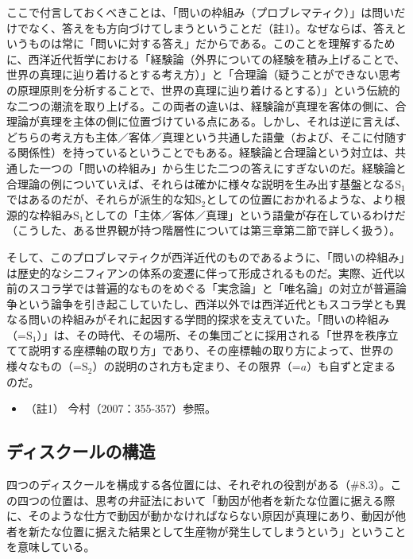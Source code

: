 ここで付言しておくべきことは、「問いの枠組み（プロブレマティク）」は問いだけでなく、答えをも方向づけてしまうということだ（註1）。なぜならば、答えというものは常に「問いに対する答え」だからである。このことを理解するために、西洋近代哲学における「経験論（外界についての経験を積み上げることで、世界の真理に辿り着けるとする考え方）」と「合理論（疑うことができない思考の原理原則を分析することで、世界の真理に辿り着けるとする）」という伝統的な二つの潮流を取り上げる。この両者の違いは、経験論が真理を客体の側に、合理論が真理を主体の側に位置づけている点にある。しかし、それは逆に言えば、どちらの考え方も主体／客体／真理という共通した語彙（および、そこに付随する関係性）を持っているということでもある。経験論と合理論という対立は、共通した一つの「問いの枠組み」から生じた二つの答えにすぎないのだ。経験論と合理論の例についていえば、それらは確かに様々な説明を生み出す基盤となる\(\textrm{S}_1\)ではあるのだが、それらが派生的な知\(\textrm{S}_2\)としての位置におかれるような、より根源的な枠組み\(\textrm{S}_1\)としての「主体／客体／真理」という語彙が存在しているわけだ（こうした、ある世界観が持つ階層性については第三章第二節で詳しく扱う）。

そして、このプロブレマティクが西洋近代のものであるように、「問いの枠組み」は歴史的なシニフィアンの体系の変遷に伴って形成されるものだ。実際、近代以前のスコラ学では普遍的なものをめぐる「実念論」と「唯名論」の対立が普遍論争という論争を引き起こしていたし、西洋以外では西洋近代ともスコラ学とも異なる問いの枠組みがそれに起因する学問的探求を支えていた。「問いの枠組み（=\(\textrm{S}_1\)）」は、その時代、その場所、その集団ごとに採用される「世界を秩序立てて説明する座標軸の取り方」であり、その座標軸の取り方によって、世界の様々なもの（=\(\textrm{S}_2\)）の説明のされ方も定まり、その限界（=\(a\)）も自ずと定まるのだ。

\begin{itemize}
\tightlist
\item
  （註1） 今村（2007：355-357）\cite{Imamura1}参照。
\end{itemize}

\subsection{ディスクールの構造}\label{ux30c7ux30a3ux30b9ux30afux30fcux30ebux306eux69cbux9020}

四つのディスクールを構成する各位置には、それぞれの役割がある（\#8.3）。この四つの位置は、思考の\mbox{弁証法}において「動因が他者を新たな位置に据える際に、そのような仕方で動因が動かなければならない原因が真理にあり、動因が他者を新たな位置に据えた結果として生産物が発生してしまうという」ということを意味している。

